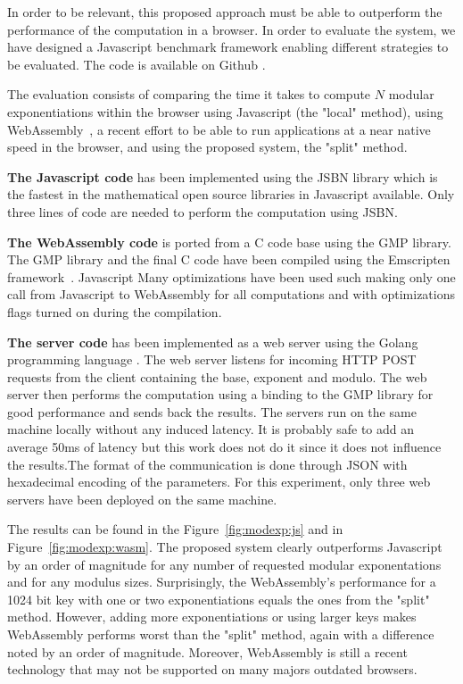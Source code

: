 \documentclass[]{article}
\begin{document}
In order to be relevant, this proposed approach must be able to outperform the
performance of the computation in a browser. In order to evaluate the
system, we have designed a Javascript benchmark framework enabling different
strategies to be evaluated. The code is available on Github \cite{code}.

The evaluation consists of comparing the time it takes to compute $N$ modular
exponentiations within the browser using Javascript (the "local" method), using
WebAssembly~\cite{haas2017bringing}, a recent effort to be able to run
applications at a near native speed in the browser, and using the proposed
system, the "split" method. 

\textbf{The Javascript code} has been implemented using the JSBN library
\cite{jsbn} which is the fastest in the mathematical open source libraries in
Javascript available.  Only three lines of code are needed to perform the
computation using JSBN. 

\textbf{The WebAssembly code} is ported from a C code base using the GMP
library. The GMP library and the final C code have been compiled using the
Emscripten framework~\cite{zakai2011emscripten}. Javascript Many optimizations
have been used such making only one call from Javascript to WebAssembly for all
computations and with optimizations flags turned on during the compilation. 

\textbf{The server code} has been implemented as a web server using the Golang
programming language \cite{golang}. The web server listens for incoming HTTP
POST requests from the client containing the base, exponent and modulo.  The web
server then performs the computation using a binding to the GMP library
\cite{gmplib} for good performance and sends back the results. The servers run
on the same machine locally without any induced latency. It is probably safe to
add an average 50ms of latency but this work does not do it since it does not
influence the results.The format of the communication is done through JSON with
hexadecimal encoding of the parameters.  For this experiment, only three web
servers have been deployed on the same machine. 

The results can be found in the Figure~\ref{fig:modexp:js} and in
Figure~\ref{fig:modexp:wasm}. The proposed system clearly outperforms Javascript
by an order of magnitude for any number of requested modular exponentations and
for any modulus sizes. Surprisingly, the WebAssembly's performance for a 1024
bit key with one or two exponentiations equals the ones from the "split" method. 
However, adding more exponentiations or using larger keys makes WebAssembly performs
worst than the "split" method, again with a difference noted by an order of
magnitude. Moreover, WebAssembly is still a recent technology that may not be
supported on many majors outdated browsers.
\end{document}
